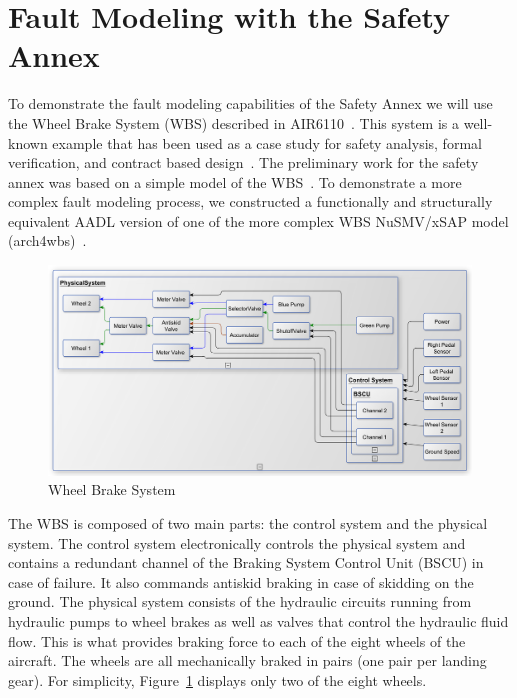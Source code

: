 \section{Fault Modeling with the Safety Annex}
\label{sec:fault_modeling}

To demonstrate the fault modeling capabilities of the Safety Annex we will use the Wheel Brake System (WBS) described in AIR6110~\cite{AIR6110}.  This system is a well-known example that has been used as a case study for safety analysis, formal verification, and contract based design~\cite{DBLP:conf/cav/BozzanoCPJKPRT15, 10.1007/978-3-319-11936-6-7, CAV2015:BoCiGrMa, Joshi05:SafeComp}. The preliminary work for the safety annex was based on a simple model of the WBS~\cite{Stewart17:IMBSA}. To demonstrate a more complex fault modeling process, we constructed a functionally and structurally equivalent AADL version of one of the more complex WBS NuSMV/xSAP model (arch4wbs)~\cite{DBLP:conf/cav/BozzanoCPJKPRT15}.    

\begin{figure}[h!]
	\centering
	\includegraphics[trim=0 9 0 5,clip,width=\textwidth]{images/wbs_arch4_diagram.pdf}
	\caption{Wheel Brake System}
	\label{fig:wbs}
\end{figure} 

The WBS is composed of two main parts: the control system and the physical system. The control system electronically controls the physical system and contains a redundant channel of the Braking System Control Unit (BSCU) in case of failure. It also commands antiskid braking in case of skidding on the ground. The physical system consists of the hydraulic circuits running from hydraulic pumps to wheel brakes as well as valves that control the hydraulic fluid flow. This is what provides braking force to each of the eight wheels of the aircraft. The wheels are all mechanically braked in pairs (one pair per landing gear). For simplicity, Figure~\ref{fig:wbs} displays only two of the eight wheels. 

